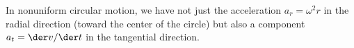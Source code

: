In nonuniform circular motion, we have not just the acceleration
$a_r=\omega^2r$ in the radial direction (toward the center of the circle) but also a component 
$a_t=\der v/\der t$ in the tangential direction.
